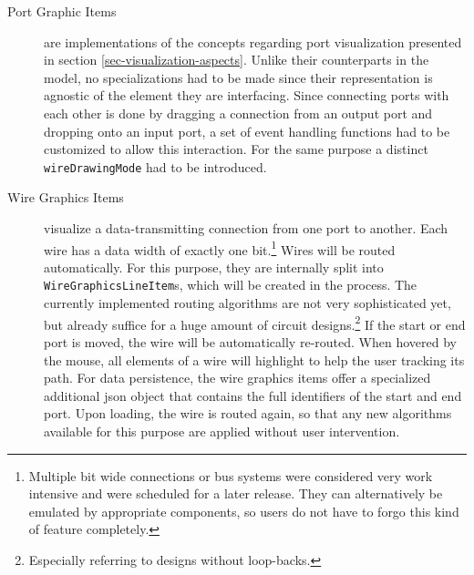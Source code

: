\begin{description}
	\item[Port Graphic Items] are implementations of the concepts regarding port visualization presented in section \ref{sec-visualization-aspects}.
	Unlike their counterparts in the model, no specializations had to be made since their representation is agnostic of the element they are interfacing.
	Since connecting ports with each other is done by dragging a connection from an output port and dropping onto an input port, a set of event handling functions had to be customized to allow this interaction.
	For the same purpose a distinct \texttt{wireDrawingMode} had to be introduced.
	
	\item[Wire Graphics Items] visualize a data-transmitting connection from one port to another.
	Each wire has a data width of exactly one bit.\footnote{
		Multiple bit wide connections or bus systems were considered very work intensive and were scheduled for a later release.
		They can alternatively be emulated by appropriate components, so users do not have to forgo this kind of feature completely.
	}
	Wires will be routed automatically.
	For this purpose, they are internally split into \texttt{WireGraphicsLineItem}s, which will be created in the process.
	The currently implemented routing algorithms are not very sophisticated yet, but already suffice for a huge amount of circuit designs.\footnote{
		Especially referring to designs without loop-backs.	
	}
	If the start or end port is moved, the wire will be automatically re-routed.
	When hovered by the mouse, all elements of a wire will highlight to help the user tracking its path.
	For data persistence, the wire graphics items offer a specialized additional \gls{json} object that contains the full identifiers of the start and end port.
	Upon loading, the wire is routed again, so that any new algorithms available for this purpose are applied without user intervention.

\end{description}
